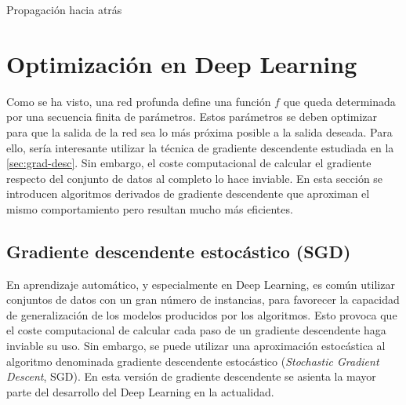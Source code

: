 \begin{algorithm}
\caption{Propagación hacia atrás}
\label{alg:backprop}
\begin{algorithmic}
  \ENDFOR
\end{algorithmic}
\end{algorithm}

\section{Optimización en Deep
Learning}
\label{sec:dl-opt}

Como se ha visto, una red profunda define una función $f$ que queda
determinada por una secuencia finita de parámetros. Estos parámetros se deben
optimizar para que la salida de la red sea lo más próxima posible a la
salida deseada. Para ello, sería interesante utilizar la técnica de
gradiente descendente estudiada en la \autoref{sec:grad-desc}. Sin embargo,
el coste computacional de calcular el gradiente respecto del conjunto
de datos al completo lo hace inviable. En esta sección se introducen
algoritmos derivados de gradiente descendente que aproximan el mismo
comportamiento pero resultan mucho más eficientes.

\subsection{Gradiente descendente estocástico
(SGD)}\label{gradiente-descendente-estocuxe1stico-sgd}\label{sec:sgd}

En aprendizaje automático, y especialmente en Deep Learning, es común
utilizar conjuntos de datos con un gran número de instancias, para
favorecer la capacidad de generalización de los modelos producidos por
los algoritmos. Esto provoca que el coste computacional de calcular cada
paso de un gradiente descendente haga inviable su uso. Sin embargo, se
puede utilizar una aproximación estocástica al algoritmo denominada
gradiente descendente estocástico (\emph{Stochastic Gradient Descent},
SGD). En esta versión de gradiente descendente se asienta la mayor
parte del desarrollo del Deep Learning en la actualidad.

